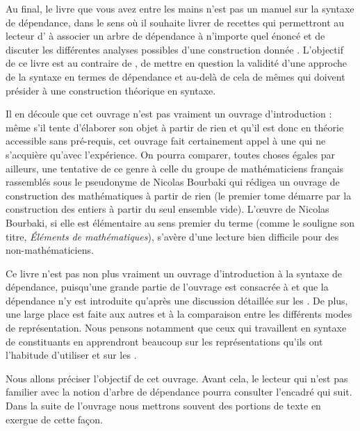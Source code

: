 Au final, le livre que vous avez entre les mains n’est pas un manuel sur la syntaxe de dépendance, dans le sens où il  souhaite  livrer de recettes qui permettront au lecteur d’ à associer un arbre de dépendance à n’importe quel énoncé et de discuter les différentes analyses possibles d’une construction donnée . L’objectif de ce livre est au contraire de  , de mettre en question la validité d’une approche de la syntaxe en termes de dépendance et au-delà de cela de  mêmes qui doivent présider à une construction théorique en syntaxe.

Il en découle que cet ouvrage n’est pas vraiment un ouvrage d’introduction : même s’il tente d’élaborer son objet à partir de rien et qu’il est donc en théorie accessible sans pré-requis, cet ouvrage fait certainement appel à une  qui ne s’acquière qu’avec l’expérience. On pourra comparer, toutes choses égales par ailleurs, une tentative de ce genre à celle du groupe de mathématiciens français rassemblés sous le pseudonyme de Nicolas Bourbaki qui rédigea un ouvrage de construction des mathématiques à partir de rien (le premier tome démarre par la construction des entiers à partir du seul ensemble vide). L’œuvre de Nicolas Bourbaki, si elle est élémentaire au sens premier du terme (comme le souligne son titre, \textit{Éléments} \textit{de mathématiques}), s’avère d’une lecture bien difficile pour des non-mathématiciens.

Ce livre n’est pas non plus vraiment un ouvrage d’introduction à la syntaxe de dépendance, puisqu’une grande partie de l’ouvrage est consacrée à    et que la dépendance n’y est introduite qu’après une discussion détaillée sur les . De plus, une large place est faite aux autres   et à la comparaison entre les différents modes de représentation. Nous pensons notamment que ceux qui travaillent en syntaxe de constituants en apprendront beaucoup sur les représentations qu’ils ont l’habitude d’utiliser et sur les .

Nous allons préciser l’objectif de cet ouvrage. Avant cela, le lecteur qui n’est pas familier avec la notion d’arbre de dépendance pourra consulter l’encadré qui suit. Dans la suite de l’ouvrage nous mettrons souvent des portions de texte en exergue de cette façon.

